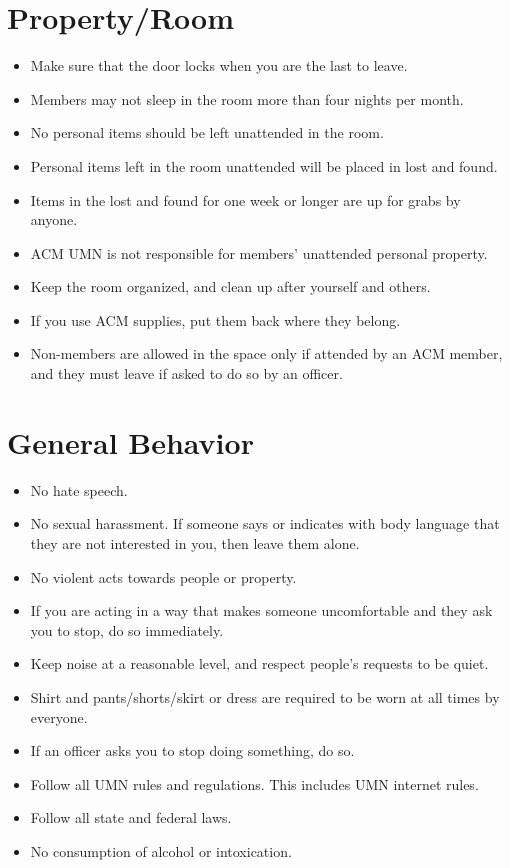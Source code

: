 





\section{Property/Room}
\begin{itemize}
	\item Make sure that the door locks when you are the last to leave.
	\item Members may not sleep in the room more than four nights per month.
	\item No personal items should be left unattended in the room.
	\item Personal items left in the room unattended will be placed in lost and found.
	\item Items in the lost and found for one week or longer are up for grabs by anyone.
	\item ACM UMN is not responsible for members’ unattended personal property.
	\item Keep the room organized, and clean up after yourself and others.
	\item If you use ACM supplies, put them back where they belong.
	\item Non-members are allowed in the space only if attended by an ACM member, and they must leave if asked to do so by an officer.
\end{itemize}

\section{General Behavior}
\begin{itemize}
	\item No hate speech.
	\item No sexual harassment. If someone says or indicates with body language that they are not interested in you, then leave them alone.
	\item No violent acts towards people or property.
	\item If you are acting in a way that makes someone uncomfortable and they ask you to stop, do so immediately.
	\item Keep noise at a reasonable level, and respect people’s requests to be quiet.
	\item Shirt and pants/shorts/skirt or dress are required to be worn at all times by everyone.
	\item If an officer asks you to stop doing something, do so.
	\item Follow all UMN rules and regulations. This includes UMN internet rules.
	\item Follow all state and federal laws.
	\item No consumption of alcohol or intoxication.
\end{itemize}

